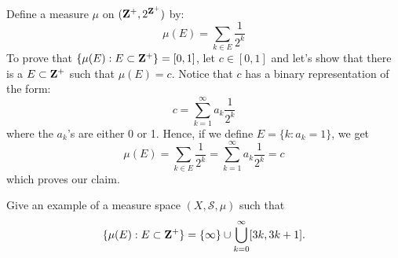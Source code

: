 \begin{solution}
    \\ Define a measure $\mu$ on $(\mathbf{Z}^+, 2^{\mathbf{Z}^+})$ by:
    $$\mu(E) = \sum_{k \in E}\frac{1}{2^k}$$
    To prove that $\{ \mu(E) : E \subset \mathbf{Z}^+\} = [0, 1]$, let $c \in [0,1]$ and let's show that there is a $E \subset \mathbf{Z}^+$ such that $\mu(E) = c$. Notice that $c$ has a binary representation of the form:
    $$c = \sum_{k=1}^{\infty}a_k\frac{1}{2^k}$$
    where the $a_k$'s are either 0 or 1. Hence, if we define $E = \{k : a_k = 1\}$, we get
    $$\mu(E) = \sum_{k \in E}\frac{1}{2^k} = \sum_{k=1}^{\infty}a_k\frac{1}{2^k} = c$$
    which proves our claim.\\
\end{solution}

\begin{exercise}
    Give an example of a measure space $(X, \mathcal{S}, \mu)$ such that 
    $$\{ \mu(E) : E \subset \mathbf{Z}^+\} = \{\infty\} \cup \bigcup_{k=0}^{\infty}[3k, 3k+1].$$\\
\end{exercise}

